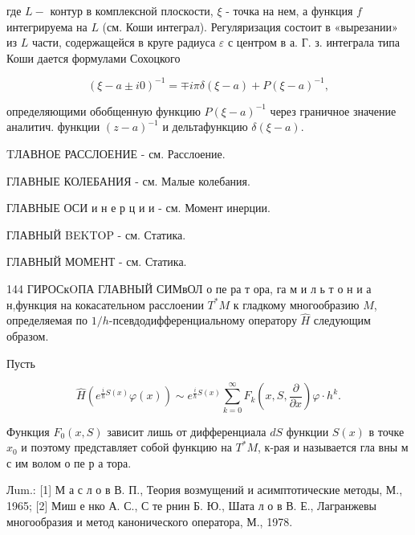 \documentclass[10pt]{article}
\begin{document}
где $L-$ контур в комплексной плоскости, $\xi$ - точка на нем, а функция $f$ интегрируема на $L$ (см. Коши интеграл). Регуляризация состоит в «вырезании» из $L$ части, содержащейся в круге радиуса $\varepsilon$ с центром в $а$. Г. з. интеграла типа Коши дается формулами Сохоцкого



\[

(\xi-a \pm i 0)^{-1}=\mp i \pi \delta(\xi-a)+P(\xi-a)^{-1},

\]



определяющими обобщенную функцию $P(\xi-a)^{-1}$ через граничное значение аналитич. функции $(z-a)^{-1}$ и дельтафункцию $\delta(\xi-a)$.



TЛАВНОЕ РАССЛОЕНИЕ - см. Расслоение.



ГЛАВНЫЕ КОЛЕБАНИЯ - см. Малые колебания.



ГЛАВНЫЕ ОСИ и н е р ц и и - см. Момент инерции.



ГЛАВНЫЙ BEKTOP - см. Статика.



ГЛАВНЫЙ МОМЕНТ - см. Статика.



144 ГИРОСкOПА ГЛАВНЫЙ СИМвОЛ о пе ра т ора, га м и л ь т о н и а н,функция на кокасательном расслоении $T^{*} M$ к гладкому многообразию $M$, определяемая по $1 / h$-псевдодифференциальному оператору $\hat{H}$ следующим образом.



Пусть



\[

\hat{H}\left(e^{\frac{i}{\hbar} S(x)} \varphi(x)\right) \sim e^{\frac{i}{\hbar} S(x)} \sum_{k=0}^{\infty} F_{k}\left(x, S, \frac{\partial}{\partial x}\right) \varphi \cdot h^{k} .

\]



Функция $F_{0}(x, S)$ зависит лишь от дифференциала $d S$ функции $S(x)$ в точке $x_{0}$ и поэтому представляет собой функцию на $T^{*} M$, к-рая и называется гла вны м с им волом о пе р а тора.



Лum.: [1] М а с л о в В. П., Теория возмущений и асимптотические методы, М., 1965; [2] Миш е нко А. С., С те рнин Б. Ю., Шата л о в В. Е., Лагранжевы многообразия и метод канонического оператора, М., 1978.
\end{document}
